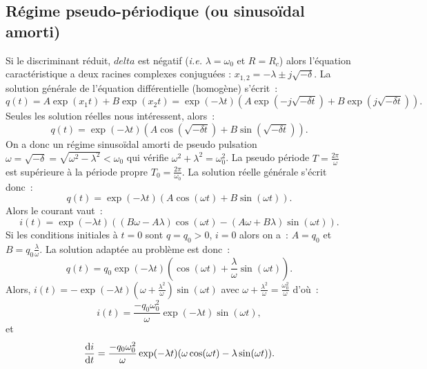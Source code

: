 \subsection{Régime pseudo-périodique (ou sinusoïdal amorti)}%
Si le discriminant réduit, \(delta\) est négatif (\emph{i.e.} \(\lambda = 
\omega_0\) et \(R = R_c\)) alors l'équation caractéristique a deux racines 
complexes conjuguées : \(x_{1, 2} = -\lambda \pm j\sqrt{-\delta}\). La solution 
générale de l'équation différentielle (homogène) s'écrit~:
\begin{equation}%
  q(t) = A \exp(x_1 t) + B \exp(x_2 t) = \exp(-\lambda t)(A\exp(-j\sqrt{-\delta 
  t})+B\exp(j\sqrt{-\delta t})).
\end{equation}%
Seules les solution réelles nous intéressent, alors~:
\begin{equation}%
  q(t) = \exp(-\lambda t)(A\cos(\sqrt{-\delta t}) + B\sin(\sqrt{-\delta t})).
\end{equation}%
On a donc un régime sinusoïdal amorti de pseudo pulsation 
\(\omega=\sqrt{-\delta} = \sqrt{\omega^2 - \lambda^2}<\omega_0\) qui vérifie 
\(\omega^2 +\lambda^2 = \omega_0^2\). La pseudo période 
\(T=\frac{2\pi}{\omega}\) est supérieure à la période propre 
\(T_0=\frac{2\pi}{\omega_0}\). La solution réelle générale s'écrit donc~:
\begin{equation}%
  q(t) = \exp(-\lambda t)(A\cos(\omega t)+B\sin(\omega t)).
\end{equation}%
Alors le courant vaut~:
\begin{equation}%
  i(t) = \exp(-\lambda t)((B\omega - A\lambda)\cos(\omega t) - (A\omega + 
  B\lambda)\sin(\omega t)).
\end{equation}%
Si les conditions initiales à \(t=0\) sont \(q=q_0>0\), \(i=0\) alors on a~: 
\(A=q_0\) et \(B=q_0\frac{\lambda}{\omega}\). La solution adaptée au problème 
est donc~:
\begin{equation}%
  q(t) = q_0 \exp(-\lambda t)\left(\cos(\omega t) + \frac{\lambda}{\omega} 
  \sin(\omega t)\right).
\end{equation}%
Alors, \(i(t) = -\exp(-\lambda t) \left(\omega 
+\frac{\lambda^2}{\omega}\right)\sin(\omega t)\) avec \(\omega + 
\frac{\lambda^2}{\omega} = \frac{\omega_0^2}{\omega}\) d'où~:
\begin{equation}%
  i(t) = \frac{-q_0\omega_0^2}{\omega}\exp(-\lambda t) \sin(\omega t),
\end{equation}%
et
\begin{equation}%
  \derived{i}{t} = \frac{-q_0\omega_0^2}{\omega}\exp(-\lambda t) (\omega 
  \cos(\omega t) - \lambda \sin(\omega t)).
\end{equation}%

